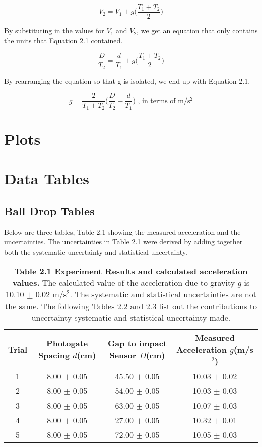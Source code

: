 \documentclass[11pt]{report}
\begin{document}
\[ V_2 = V_1 + g\Bigg(\frac{T_1 + T_2}{2}\Bigg) \]

By substituting in the values for \(V_1\) and \(V_2\), we get an equation that
only contains the units that Equation 2.1 contained.

\[ \frac{D}{T_2} = \frac{d}{T_1} + g\Bigg(\frac{T_1 + T_2}{2}\Bigg) \]

By rearranging the equation so that g is isolated, we end up with Equation 2.1.

\[ g = \frac{2}{T_1 + T_2}\Bigg(\frac{D}{T_2} - \frac{d}{T_1}\Bigg) \textrm{ , in
terms of m/s$^2$}\]

\section*{Plots}

\section*{Data Tables}
\subsection*{Ball Drop Tables}
Below are three tables, Table 2.1 showing the measured acceleration and the
uncertainties.  The uncertainties in Table 2.1  were derived by adding together both the
systematic uncertainty and statistical uncertainty.  

\begin{table}[h]
    \centering
    \begin{tabular}{|c | c | c | c |}
    \hline
    Trial & Photogate Spacing \(d\)(cm) & Gap to impact Sensor \(D\)(cm) & Measured Acceleration \(g\)(m/s$^2$) \\
    \hline
    1 & 8.00 $\pm$ 0.05 & 45.50 $\pm$ 0.05 & 10.03 $\pm$ 0.02 \\
    \hline
    2 & 8.00 $\pm$ 0.05 & 54.00 $\pm$ 0.05 & 10.03 $\pm$ 0.03 \\
    \hline
    3 & 8.00 $\pm$ 0.05 & 63.00 $\pm$ 0.05 & 10.07 $\pm$ 0.03 \\
    \hline
    4 & 8.00 $\pm$ 0.05 & 27.00 $\pm$ 0.05 & 10.32 $\pm$ 0.01 \\
    \hline
    5 & 8.00 $\pm$ 0.05 & 72.00 $\pm$ 0.05 & 10.05 $\pm$ 0.03 \\
    \hline
    \end{tabular}
    \caption*{\textbf{Table 2.1 Experiment Results and calculated acceleration
    values.} The calculated value of the acceleration due to gravity \(g\) is
10.10 $\pm$ 0.02 m/s$^2$.  The systematic and statistical uncertainties are not
the same. The following Tables 2.2 and 2.3 list out the contributions to
uncertainty systematic and statistical uncertainty made.}
\end{table}
\end{document}
